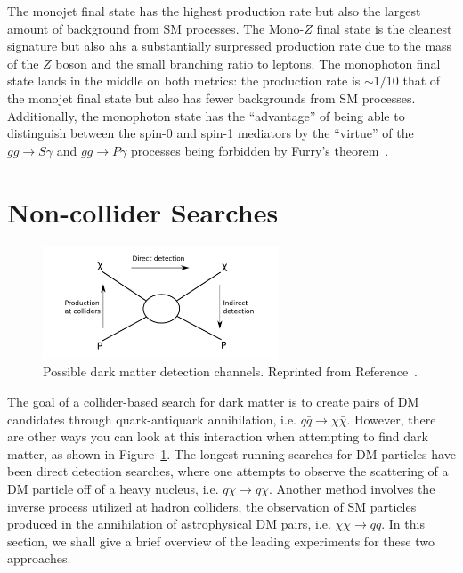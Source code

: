 The monojet final state has the highest production rate but also the largest amount of background from SM processes.
The Mono-$Z$ final state is the cleanest signature but also ahs a substantially surpressed production rate due to the mass of the $Z$ boson and the small branching ratio to leptons.
The monophoton final state lands in the middle on both metrics: the production rate is $\sim 1/10$ that of the monojet final state but also has fewer backgrounds from SM processes.
Additionally, the monophoton state has the ``advantage'' of being able to distinguish between the spin-0 and spin-1 mediators by the ``virtue'' of the $gg \rightarrow S \gamma$ and $gg \rightarrow P \gamma$ processes being forbidden by Furry's theorem~\cite{Gabrielli2016}.

\section{Non-collider Searches}
\label{sec:dm_search}

\begin{figure}[htbp]
  \centering
  \includegraphics[width=0.625\textwidth]{DarkMatter/Figures/dm_box.png}
  \caption{
    Possible dark matter detection channels.
    Reprinted from Reference~\cite{Undagoitia2015}.
  }
  \label{fig:dm_box}
\end{figure}

The goal of a collider-based search for dark matter is to create pairs of DM candidates through quark-antiquark annihilation, i.e. $q\bar q \rightarrow \chi\bar\chi$.
However, there are other ways you can look at this interaction when attempting to find dark matter, as shown in Figure~\ref{fig:dm_box}.
The longest running searches for DM particles have been direct detection searches, where one attempts to observe the scattering of a DM particle off of a heavy nucleus, i.e. $q \chi \rightarrow q \chi$.
Another method involves the inverse process utilized at hadron colliders, the observation of SM particles produced in the annihilation of astrophysical DM pairs, i.e. $\chi\bar\chi \rightarrow q \bar q$.
In this section, we shall give a brief overview of the leading experiments for these two approaches.

